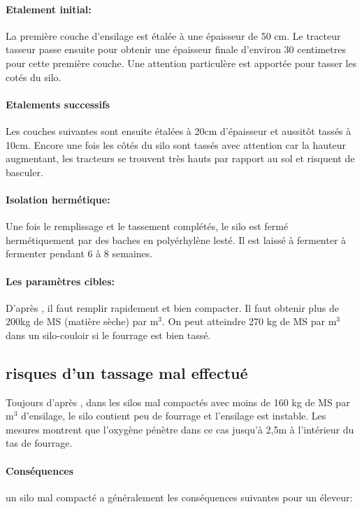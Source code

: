 \documentclass[12pt,a4paper]{report}
\begin{document}
\paragraph{Etalement initial:} La première couche d'ensilage est étalée à une épaisseur de 50 cm. Le tracteur tasseur passe ensuite pour obtenir une épaisseur finale d'environ 30 centimetres pour cette première couche. Une attention particulère est apportée pour tasser les cotés du silo.

\paragraph{Etalements successifs} Les couches suivantes sont ensuite étalées à 20cm d'épaisseur et aussitôt tassés à 10cm. Encore une fois les côtés du silo sont tassés avec attention car la hauteur augmentant, les tracteurs se trouvent très hauts par rapport au sol et risquent de basculer.

\paragraph{Isolation hermétique:} Une fois le remplissage et le tassement complétés, le silo est fermé hermétiquement par des baches en polyérhylène lesté. Il est laissé à fermenter à fermenter pendant 6 à 8 semaines.

\paragraph{Les paramètres cibles: } D'après \cite{trachsler_planifier_nodate}, il faut remplir rapidement et bien compacter. Il faut obtenir plus de 200kg de MS (matière sèche) par m$^3$. On peut atteindre 270 kg de MS par m$^3$ dans un silo-couloir si le fourrage est bien tassé.


\subsection{risques d'un tassage mal effectué}
Toujours d'après \cite{trachsler_planifier_nodate}, dans les silos mal compactés avec moins de 160 kg de MS par m$^3$ d'ensilage, le silo contient peu de fourrage et l'ensilage est instable. Les mesures montrent que l'oxygène pénètre dans ce cas jusqu'à 2,5m à l'intérieur du tas de fourrage. 

\paragraph{Conséquences} un silo mal compacté a généralement les conséquences suivantes pour un éleveur:
\end{document}
